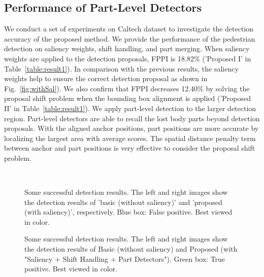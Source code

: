 \documentclass[journal]{IEEEtran}
\begin{document}
\subsection{Performance of Part-Level Detectors}
\label{subsec:per-part}

We conduct a set of experiments on Caltech dataset to investigate the detection accuracy of the proposed method. We provide the performance of the pedestrian detection on saliency weights, shift handling, and part merging. When saliency weights are applied to the detection proposals, FPPI is 18.82\% ('Proposed I' in Table~\ref{table:result1}). In comparison with the previous results, the saliency weights help to ensure the correct detection proposal as shown in Fig.~\ref{fig:withSal}). We also confirm that FPPI decreases 12.40\% by solving the proposal shift problem when the bounding box alignment is applied ('Proposed II' in Table~\ref{table:result1}). We apply part-level detection to the larger detection region. Part-level detectors are able to recall the lost body parts beyond detection proposals. With the aligned anchor positions, part positions are more accurate by localizing the largest area with average scores. The spatial distance penalty term between anchor and part positions is very effective to consider the proposal shift problem.

 \begin{figure}[t]
\centering
{} \quad
{}\\
\quad
{}
\caption{Some successful detection results. The left and right images show the detection results of 'basic (without saliency)' and 'proposed (with saliency)', respectively. Blue box: False positive. Best viewed in color.}
\label{fig:result3}
\end{figure}

\begin{figure}[t]
\centering
{} \quad
{}
\caption{Some successful detection results. The left and right images show the detection results of Basic (without saliency) and Proposed (with "Saliency + Shift Handling + Part Detectors"). Green box: True positive. Best viewed in color.}
\label{fig:result2}
\end{figure}
\end{document}
